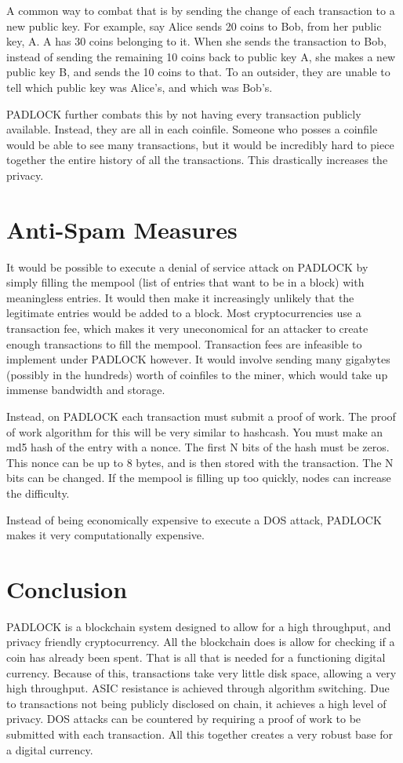 \documentclass[12pt, letterpaper]{article}
\begin{document}
A common way to combat that is by sending the change of each transaction to a new
public key. For example, say Alice sends 20 coins to Bob, from her public key, A.
A has 30 coins belonging to it. When she sends the transaction to Bob, instead
of sending the remaining 10 coins back to public key A, she makes a new public
key B, and sends the 10 coins to that. To an outsider, they are unable to tell
which public key was Alice's, and which was Bob's.

PADLOCK further combats this by not having every transaction publicly available.
Instead, they are all in each coinfile. Someone who posses a coinfile would be
able to see many transactions, but it would be incredibly hard to piece together
the entire history of all the transactions. This drastically increases the
privacy.


\section{Anti-Spam Measures}
It would be possible to execute a denial of service attack on PADLOCK by simply
filling the mempool (list of entries that want to be in a block) with
meaningless entries. It would then make it increasingly unlikely that the
legitimate entries would be added to a block. Most cryptocurrencies use a
transaction fee, which makes it very uneconomical for an attacker to create
enough transactions to fill the mempool. Transaction fees are infeasible to
implement under PADLOCK however. It would involve sending many gigabytes
(possibly in the hundreds) worth of coinfiles to the miner, which would take up
immense bandwidth and storage.

Instead, on PADLOCK each transaction must submit a proof of work. The proof of
work algorithm for this will be very similar to hashcash. You must make an md5
hash of the entry with a nonce. The first N bits of the hash must be zeros. This
nonce can be up to 8 bytes, and is then stored with the transaction. The N bits
can be changed. If the mempool is filling up too quickly, nodes can increase the
difficulty.

Instead of being economically expensive to execute a DOS attack, PADLOCK makes
it very computationally expensive.


\section{Conclusion}
PADLOCK is a blockchain system designed to allow for a high throughput, and
privacy friendly cryptocurrency. All the blockchain does is allow for checking
if a coin has already been spent. That is all that is needed for a functioning
digital currency. Because of this, transactions take very little disk space,
allowing a very high throughput. ASIC resistance is achieved through algorithm
switching. Due to transactions not being publicly disclosed on chain, it
achieves a high level of privacy. DOS attacks can be countered by requiring a
proof of work to be submitted with each transaction. All this together creates a very robust base for a digital currency.
\end{document}
